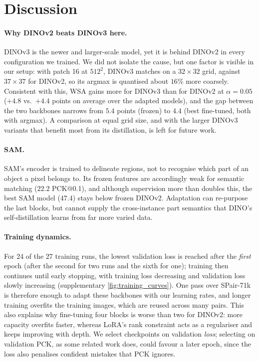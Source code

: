 \section{Discussion}
\label{sec:discussion}

\paragraph{Why DINOv2 beats DINOv3 here.}
DINOv3 is the newer and larger-scale model, yet it is behind DINOv2 in every configuration we trained. We did not isolate the cause, but one factor is visible in our setup: with patch 16 at $512^2$, DINOv3 matches on a $32\times32$ grid, against $37\times37$ for DINOv2, so its argmax is quantised about $16\%$ more coarsely. Consistent with this, WSA gains more for DINOv3 than for DINOv2 at $\alpha{=}0.05$ ($+4.8$ vs.\ $+4.4$ points on average over the adapted models), and the gap between the two backbones narrows from $5.4$ points (frozen) to $4.4$ (best fine-tuned, both with argmax). A comparison at equal grid size, and with the larger DINOv3 variants that benefit most from its distillation, is left for future work.

\paragraph{SAM.}
SAM's encoder is trained to delineate regions, not to recognise which part of an object a pixel belongs to. Its frozen features are accordingly weak for semantic matching ($22.2$ PCK@0.1), and although supervision more than doubles this, the best SAM model ($47.4$) stays below frozen DINOv2. Adaptation can re-purpose the last blocks, but cannot supply the cross-instance part semantics that DINO's self-distillation learns from far more varied data.

\paragraph{Training dynamics.}
For 24 of the 27 training runs, the lowest validation loss is reached after the \emph{first} epoch (after the second for two runs and the sixth for one); training then continues until early stopping, with training loss decreasing and validation loss slowly increasing (supplementary \cref{fig:training_curves}). One pass over SPair-71k is therefore enough to adapt these backbones with our learning rates, and longer training overfits the training images, which are reused across many pairs. This also explains why fine-tuning four blocks is worse than two for DINOv2: more capacity overfits faster, whereas LoRA's rank constraint acts as a regulariser and keeps improving with depth. We select checkpoints on validation \emph{loss}; selecting on validation PCK, as some related work does, could favour a later epoch, since the loss also penalises confident mistakes that PCK ignores.

